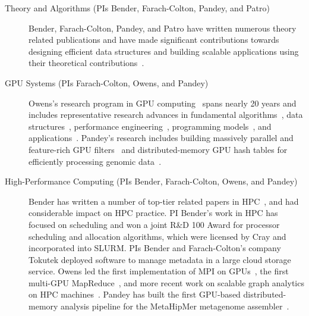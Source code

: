 \begin{description}%
    \item[Theory and Algorithms (PIs Bender, Farach-Colton, Pandey, and Patro)]
    Bender, Farach-Colton, Pandey, and Patro have written numerous theory related publications and have made significant contributions towards designing efficient data structures and building scalable applications using their theoretical contributions~\cite{BenderFaGo18,BenderFaJo12,PandeyBJ17,PandeyAlBe18,PandeyBeJo17a,PandeyBeJo17b,ConwayFaSh18,JannenYuZh15a,JannenYuZh15b,YuanZhJa16,pandey2021terrace,pandey2021variantstore,pandey2022iceberght,Assadi2023,Bender2023,pandey2020timely,PandeyCDBFJ21,mccoy2022high,Almodaresi2018Pufferfish,fan2023spt,Khan2021,Khan2022,Khan2023CapsSA,fan2023fulgor,Pibiri2023MacDBG}.

    \item[GPU Systems (PIs Farach-Colton, Owens, and Pandey)] Owens's research program in GPU computing~\cite{Owens:2007:ASO,Owens:2008:GC} spans nearly 20 years and includes representative research advances in fundamental algorithms~\cite{Sengupta:2007:SPF}, data structures~\cite{Lefohn:2006:GGE,Alcantara:2009:RPH}, %
    performance engineering~\cite{Zhang:2011:AQP}, programming models~\cite{Gupta:2012:ASO, Tzeng:2010:TMF}, and applications~\cite{Wang:2017:GGG}. Pandey's research includes building massively parallel and feature-rich GPU filters~\cite{mccoy2022high} and distributed-memory GPU hash tables for efficiently processing genomic data~\cite{nisa2021distributed}.

    \item[High-Performance Computing (PIs Bender, Farach-Colton, Owens, and
        Pandey)] Bender has
      written a number of top-tier related papers in HPC~\cite{pandey2020timely,bender2017two,eckstein2015pebbl,agrawal1989four,bender2008communication,greenberg1999enabling},
      and had considerable impact on HPC practice.
      PI Bender's work in HPC has focused on scheduling and  won a joint R\&D 100 Award for processor scheduling and allocation algorithms, which were licensed by Cray and incorporated into SLURM\@.  PIs Bender and Farach-Colton's company Tokutek deployed software to manage metadata in a large cloud storage service. Owens led the first implementation of MPI on GPUs~\cite{Stuart:2009:MPO:withouturl,Stuart:2011:EMT}, the first multi-GPU MapReduce~\cite{Stuart:2011:MMO}, and more recent work on scalable graph analytics on HPC machines~\cite{Pan:2018:SBS,Pan:2017:MGA,Chen:2022:SIP}. Pandey has built the first GPU-based distributed-memory \kmer analysis pipeline for the MetaHipMer metagenome assembler~\cite{nisa2021distributed}.


\end{description}
